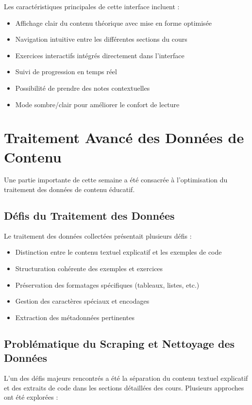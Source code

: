 Les caractéristiques principales de cette interface incluent :
\begin{itemize}
  \item Affichage clair du contenu théorique avec mise en forme optimisée
  \item Navigation intuitive entre les différentes sections du cours
  \item Exercices interactifs intégrés directement dans l'interface
  \item Suivi de progression en temps réel
  \item Possibilité de prendre des notes contextuelles
  \item Mode sombre/clair pour améliorer le confort de lecture
\end{itemize}

\section{Traitement Avancé des Données de Contenu}

Une partie importante de cette semaine a été consacrée à l'optimisation du traitement des données de contenu éducatif.

\subsection{Défis du Traitement des Données}

Le traitement des données collectées présentait plusieurs défis :
\begin{itemize}
  \item Distinction entre le contenu textuel explicatif et les exemples de code
  \item Structuration cohérente des exemples et exercices
  \item Préservation des formatages spécifiques (tableaux, listes, etc.)
  \item Gestion des caractères spéciaux et encodages
  \item Extraction des métadonnées pertinentes
\end{itemize}

\subsection{Problématique du Scraping et Nettoyage des Données}

L'un des défis majeurs rencontrés a été la séparation du contenu textuel explicatif et des extraits de code dans les sections détaillées des cours. Plusieurs approches ont été explorées :

